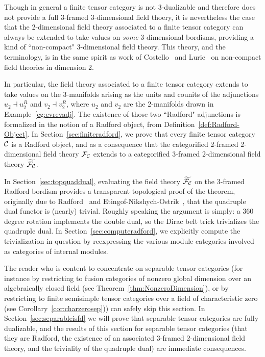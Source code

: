 \documentclass{amsart}
\begin{document}
Though in general a finite tensor category is not 3-dualizable and therefore does not provide a full 3-framed 3-dimensional field thoery, it is nevertheless the case that the 2-dimensional field theory associated to a finite tensor category can always be extended to take values on \emph{some} 3-dimensional bordisms, providing a kind of ``non-compact" 3-dimensional field theory.  This theory, and the terminology, is in the same spirit as work of Costello~\cite{MR2298823} and Lurie~\cite[\S 4.2]{lurie-ch} on non-compact field theories in dimension 2.

In particular, the field theory associated to a finite tensor category extends to take values on the 3-manifolds arising as the units and counits of the adjunctions $u_2 \dashv u_2^R$ and $v_2 \dashv v_2^R$, where $u_2$ and $v_2$ are the 2-manifolds drawn in Example~\ref{eg:evrevadj}.  The existence of those two ``Radford" adjunctions is formalized in the notion of a Radford object, from Definition~\ref{def:Radford-Object}.  In Section~\ref{sec:finiteradford}, we prove that every finite tensor category $\mathcal C$ is a Radford object, and as a consequence that the categorified 2-framed 2-dimensional field theory $\mathcal F_\mathcal C$ extends to a categorified 3-framed 2-dimensional field theory $\widetilde{\mathcal F_\mathcal C}$.  

In Section~\ref{sec:topquaddual}, evaluating the field theory $\widetilde{\mathcal F_\mathcal C}$ on the 3-framed Radford bordism provides a transparent topological proof of the theorem, originally due to Radford~\cite{MR0407069} and Etingof-Nikshych-Ostrik~\cite{MR2097289}, that the quadruple dual functor is (nearly) trivial.  Roughly speaking the argument is simply: a 360 degree rotation implements the double dual, so the Dirac belt trick trivializes the quadruple dual.  In Section~\ref{sec:computeradford}, we explicitly compute the trivialization in question by reexpressing the various module categories involved as categories of internal modules.

The reader who is content to concentrate on separable tensor categories (for instance by restricting to fusion categories of nonzero global dimension over an algebraically closed field (see Theorem~\ref{thm:NonzeroDimension}), or by restricting to finite semisimple tensor categories over a field of characteristic zero (see Corollary~\ref{cor:charzerosep})) can safely skip this section.  In Section~\ref{sec:separableisfd} we will prove that separable tensor categories are fully dualizable, and the results of this section for separable tensor categories (that they are Radford, the existence of an associated 3-framed 2-dimensional field theory, and the triviality of the quadruple dual) are immediate consequences.
\end{document}
